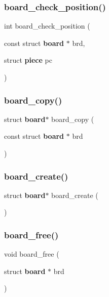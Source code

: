 \subsubsection{board\+\_\+check\+\_\+position()}
{\footnotesize\ttfamily int board\+\_\+check\+\_\+position (\begin{DoxyParamCaption}\item[{const struct \textbf{ board} $\ast$}]{brd,  }\item[{struct \textbf{ piece}}]{pc }\end{DoxyParamCaption})\hspace{0.3cm}{\ttfamily [inline]}}

\mbox{\label{board_8h_a1e27212e0cf664697c846562ae704dc2}} 
\subsubsection{board\+\_\+copy()}
{\footnotesize\ttfamily struct \textbf{ board}$\ast$ board\+\_\+copy (\begin{DoxyParamCaption}\item[{const struct \textbf{ board} $\ast$}]{brd }\end{DoxyParamCaption})}

\mbox{\label{board_8h_a590e915531ea7b532175b43fac0aa3a2}} 
\subsubsection{board\+\_\+create()}
{\footnotesize\ttfamily struct \textbf{ board}$\ast$ board\+\_\+create (\begin{DoxyParamCaption}{ }\end{DoxyParamCaption})}

\mbox{\label{board_8h_a29ce3ebc1a2bd8e6d1dce7e45c4cf3df}} 
\subsubsection{board\+\_\+free()}
{\footnotesize\ttfamily void board\+\_\+free (\begin{DoxyParamCaption}\item[{struct \textbf{ board} $\ast$}]{brd }\end{DoxyParamCaption})\hspace{0.3cm}{\ttfamily [inline]}}

